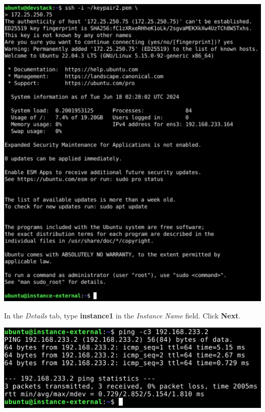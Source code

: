 \documentclass[letterpaper, 12pt]{article}
\begin{document}
\begin{enumerate}
\begin{labstep}
        \begin{center}
            \includegraphics[width=\linewidth]{images/part6/step10.png}
        \end{center}
    \end{labstep}

    \begin{labstep}
        In the \textit{Details} tab, type \textbf{instance1} in the \textit{Instance Name} field.
        Click \textbf{Next}.

        \begin{center}
            \includegraphics[width=\linewidth]{images/part6/step11.png}
        \end{center}
    \end{labstep}


\end{enumerate}
\end{document}
